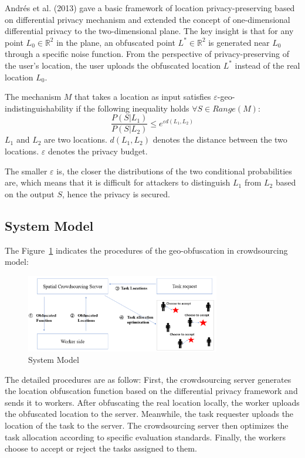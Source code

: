 Andrés et al. (2013) gave a basic framework of location privacy-preserving based on differential privacy mechanism and extended the concept of one-dimensional differential privacy to the two-dimensional plane. The key insight is that for any point $L_0 \in \mathbb R^2$ in the plane, an obfuscated point $L^* \in \mathbb R^2$ is generated near $L_0$ through a specific noise function. From the perspective of privacy-preserving of the user's location, the user uploads the obfuscated location $L^*$ instead of the real location $L_0$.

\begin{definition}
	The mechanism $M$ that takes a location as input satisfies $\varepsilon$-geo-indistinguishability if the following inequality holds $\forall S \in Range(M)$: 
	$$
	\frac{P(S|L_1)}{P(S|L_2)} \leq e^{\varepsilon d(L_1,L_2)}
	$$
	$L_1$ and $L_2$ are two locations. $d(L_1,L_2)$ denotes the distance between the two locations. $\varepsilon$ denotes the privacy budget. 
\end{definition}
 The smaller $\varepsilon$ is, the closer the distributions of the two conditional probabilities are, which means that it is difficult for attackers to distinguish $L_1$ from $L_2$ based on the output $S$, hence the privacy is secured.

\subsection{System Model} %
\label{Sec2.3}
The Figure~\ref{img:SysModel} indicates the procedures of the geo-obfuscation in crowdsourcing model:

\begin{figure}
\includegraphics[width=8.5cm]{SysModel}
\caption{System Model}
\label{img:SysModel}
\end{figure}

The detailed procedures are as follow:
First, the crowdsourcing server generates the location obfuscation function based on the differential privacy framework and sends it to workers. After obfuscating the real location locally, the worker uploads the obfuscated location to the server. Meanwhile, the task requester uploads the location of the task to the server. The crowdsourcing server then optimizes the task allocation according to specific evaluation standards. Finally, the workers choose to accept or reject the tasks assigned to them.

